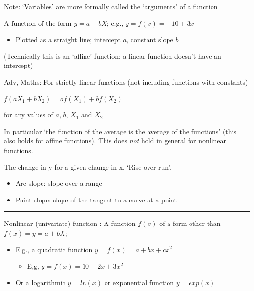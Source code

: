 \documentclass[]{article}
\providecommand{\tightlist}{%
  \setlength{\itemsep}{0pt}\setlength{\parskip}{0pt}}
\begin{document}
Note: `Variables' are more formally called the `arguments' of a function

\bigskip

\begin{description}
\tightlist
\item[Linear function]
A function of the form \(y=a+bX\); e.g., \(y = f(x) = -10 + 3x\)
\end{description}

\begin{itemize}
\tightlist
\item
  Plotted as a straight line; intercept \(a\), constant slope \(b\)
\end{itemize}

(Technically this is an `affine' function; a linear function doesn't have an intercept)

Adv, Maths: For strictly linear functions (not including functions with constants)

\(f(a X_1 + b X_2) = a f(X_1) + b f(X_2)\)

for any values of \(a\), \(b\), \(X_1\) and \(X_2\)

In particular `the function of the average is the average of the functions' (this also holds for affine functions).
This does \emph{not} hold in general for nonlinear functions.

\bigskip

\begin{description}
\tightlist
\item[Slope of \(y = f(x)\)]
The change in y for a given change in x. `Rise over run'.
\end{description}

\begin{itemize}
\item
  Arc slope: slope over a range
\item
  Point slope: slope of the tangent to a curve at a point
\end{itemize}

\begin{center}\rule{0.5\linewidth}{\linethickness}\end{center}

Nonlinear (univariate) function
: A function \(f(x)\) of a form other than \(f(x) = y=a+bX\);

\begin{itemize}
\tightlist
\item
  E.g., a quadratic function \(y = f(x) = a + bx + cx^2\)

  \begin{itemize}
  \tightlist
  \item
    E,g, \(y = f(x) = 10 - 2x + 3x^2\)
  \end{itemize}
\item
  Or a logarithmic \(y=ln(x)\) or exponential function \(y = exp(x)\)
\end{itemize}
\end{document}
